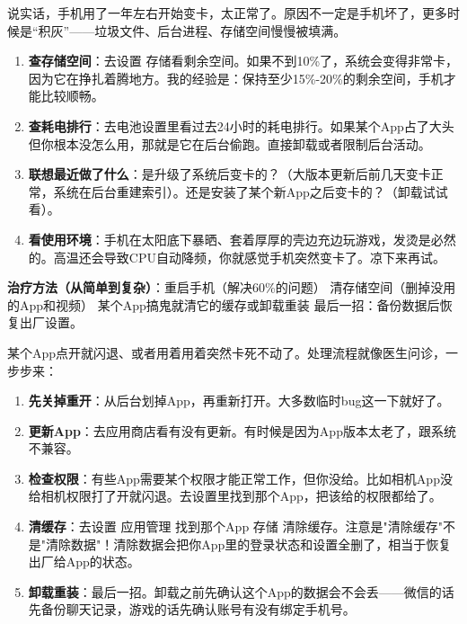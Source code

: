 


说实话，手机用了一年左右开始变卡，太正常了。原因不一定是手机坏了，更多时候是“积灰”——垃圾文件、后台进程、存储空间慢慢被填满。


\begin{enumerate}
  \item \textbf{查存储空间}：去设置 存储看剩余空间。如果不到10\%了，系统会变得非常卡，因为它在挣扎着腾地方。我的经验是：保持至少15\%-20\%的剩余空间，手机才能比较顺畅。
  \item \textbf{查耗电排行}：去电池设置里看过去24小时的耗电排行。如果某个App占了大头但你根本没怎么用，那就是它在后台偷跑。直接卸载或者限制后台活动。
  \item \textbf{联想最近做了什么}：是升级了系统后变卡的？（大版本更新后前几天变卡正常，系统在后台重建索引）。还是安装了某个新App之后变卡的？（卸载试试看）。
  \item \textbf{看使用环境}：手机在太阳底下暴晒、套着厚厚的壳边充边玩游戏，发烫是必然的。高温还会导致CPU自动降频，你就感觉手机突然变卡了。凉下来再试。
\end{enumerate}

\textbf{治疗方法（从简单到复杂）}：重启手机（解决60\%的问题） 清存储空间（删掉没用的App和视频） 某个App搞鬼就清它的缓存或卸载重装 最后一招：备份数据后恢复出厂设置。


某个App点开就闪退、或者用着用着突然卡死不动了。处理流程就像医生问诊，一步步来：

\begin{enumerate}
  \item \textbf{先关掉重开}：从后台划掉App，再重新打开。大多数临时bug这一下就好了。
  \item \textbf{更新App}：去应用商店看有没有更新。有时候是因为App版本太老了，跟系统不兼容。
  \item \textbf{检查权限}：有些App需要某个权限才能正常工作，但你没给。比如相机App没给相机权限打了开就闪退。去设置里找到那个App，把该给的权限都给了。
  \item \textbf{清缓存}：去设置 应用管理 找到那个App 存储 清除缓存。注意是"清除缓存"不是"清除数据"！清除数据会把你App里的登录状态和设置全删了，相当于恢复出厂给App的状态。
  \item \textbf{卸载重装}：最后一招。卸载之前先确认这个App的数据会不会丢——微信的话先备份聊天记录，游戏的话先确认账号有没有绑定手机号。
\end{enumerate}

